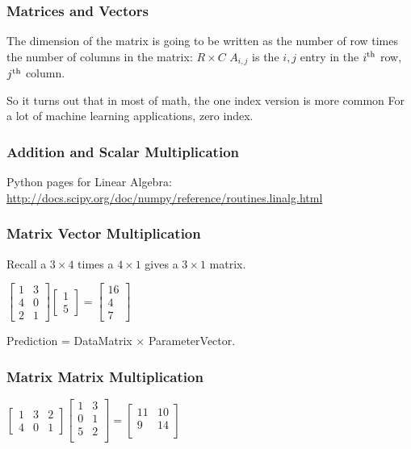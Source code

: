 \documentclass[11pt,a4paper]{article}
\begin{document}
    \subsubsection{Matrices and Vectors}
    The dimension of the matrix is going to be written as the number of row times the number of columns in the matrix:
    $R \times C$
    $A_{i,j}$ is the $i,j$ entry in the $i^{\rm th}$ row, $j^{\rm th}$ column. 

    So it turns out that in most of math, the one index version is
    more common For a lot of machine learning applications, zero index.\\

    \subsubsection{Addition and Scalar Multiplication}
    Python pages for Linear Algebra:
    \href{http://docs.scipy.org/doc/numpy/reference/routines.linalg.html}{http://docs.scipy.org/doc/numpy/reference/routines.linalg.html}
   \subsubsection{Matrix Vector Multiplication}
Recall a $3\times4$ times a $4\times1$ gives a $3\times1$ matrix. 

$\begin{bmatrix}
 1 & 3 \\ 
4 & 0\\ 
2  & 1
\end{bmatrix} \begin{bmatrix}
1\\ 
5 
\end{bmatrix} = 
\begin{bmatrix}
16 \\ 
4 \\ 
7
\end{bmatrix}
$

Prediction = DataMatrix $\times$ ParameterVector. \\

      \subsubsection{Matrix Matrix Multiplication}
$\begin{bmatrix}
 1 & 3 & 2\\ 
4 & 0  & 1
\end{bmatrix} \begin{bmatrix}
1 & 3 \\ 
0 & 1 \\
5 & 2 \\
\end{bmatrix} = 
\begin{bmatrix}
11 & 10 \\ 
9 & 14\\ 
\end{bmatrix}
$\\
\end{document}
